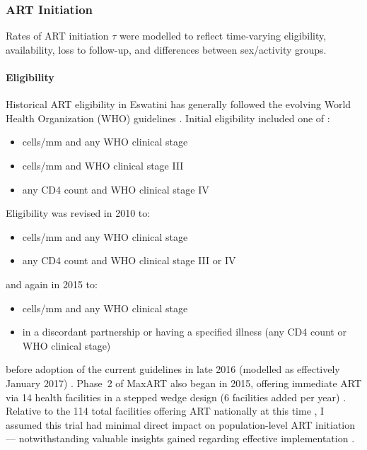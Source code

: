 \subsubsection{ART Initiation}\label{model.par.cascade.tx}
Rates of ART initiation $\tau$ were modelled to reflect
time-varying eligibility, availability, loss to follow-up,
and differences between sex/activity groups.
\paragraph{Eligibility}
Historical ART eligibility in Eswatini has generally followed
the evolving World Health Organization (WHO) guidelines
\cite{WHO2003art,WHO2007art,WHO2013art,WHO2016art}.
Initial eligibility included one of \cite{EswMOH2006}:
\begin{itemize}
  \item {} cells/mm and any WHO clinical stage
  \item {} cells/mm and WHO clinical stage III
  \item any CD4 count and WHO clinical stage IV
\end{itemize}
Eligibility was revised in 2010 \cite{EswMOH2010} to:
\begin{itemize}
  \item {} cells/mm and any WHO clinical stage
  \item any CD4 count and WHO clinical stage III or IV
\end{itemize}
and again in 2015 \cite{EswMOH2015} to:
\begin{itemize}
  \item {} cells/mm and any WHO clinical stage
  \item in a discordant partnership or having a specified illness (any CD4 count or WHO clinical stage)
\end{itemize}
before adoption of the current  guidelines
in late 2016 (modelled as effectively January 2017) \cite{MaxART2,EswMOH2018}.
Phase~2 of MaxART also began in 2015, offering immediate ART
via 14 health facilities in a stepped wedge design (6 facilities added per year) \cite{MaxART2}.
Relative to the 114 total facilities offering ART nationally at this time \cite{NERCHA2014},
I assumed this trial had minimal direct impact on population-level ART initiation
--- notwithstanding valuable insights gained regarding effective implementation \cite{MaxART2}.
